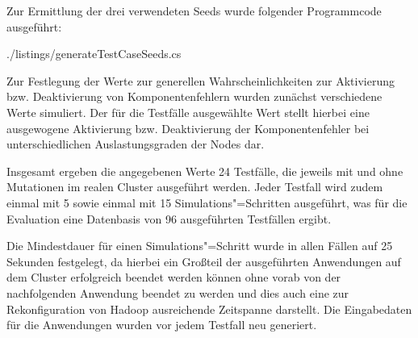 Zur Ermittlung der drei verwendeten Seeds wurde folgender Programmcode ausgeführt:


{./listings/generateTestCaseSeeds.cs}

Zur Festlegung der Werte zur generellen Wahrscheinlichkeiten zur Aktivierung bzw. Deaktivierung von Komponentenfehlern wurden zunächst verschiedene Werte simuliert.
Der für die Testfälle ausgewählte Wert stellt hierbei eine ausgewogene Aktivierung bzw. Deaktivierung der Komponentenfehler bei unterschiedlichen Auslastungsgraden der Nodes dar.

Insgesamt ergeben die angegebenen Werte 24 Testfälle, die jeweils mit und ohne Mutationen im realen Cluster ausgeführt werden.
Jeder Testfall wird zudem einmal mit 5 sowie einmal mit 15 Simulations"=Schritten ausgeführt, was für die Evaluation eine Datenbasis von 96 ausgeführten Testfällen ergibt.

Die Mindestdauer für einen Simulations"=Schritt wurde in allen Fällen auf 25 Sekunden festgelegt, da hierbei ein Großteil der ausgeführten Anwendungen auf dem Cluster erfolgreich beendet werden können ohne vorab von der nachfolgenden Anwendung beendet zu werden und dies auch eine zur Rekonfiguration von Hadoop ausreichende Zeitspanne darstellt.
Die Eingabedaten für die Anwendungen wurden vor jedem Testfall neu generiert.
